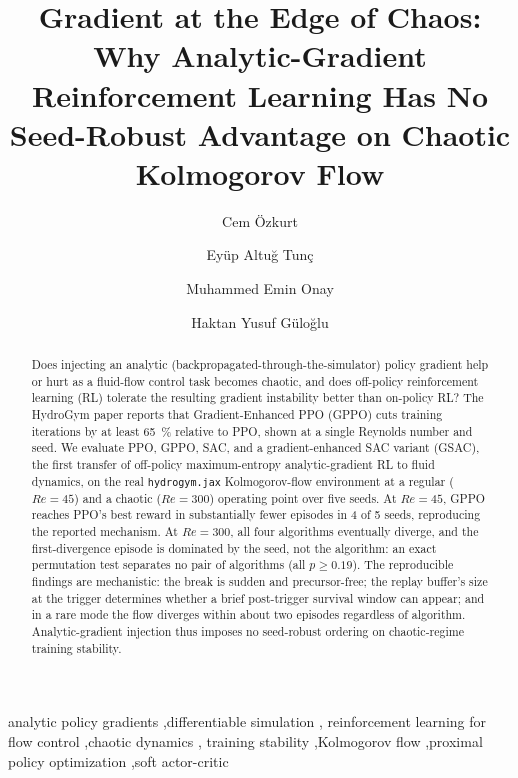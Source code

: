 \documentclass[preprint,12pt,3p]{elsarticle}
\renewcommand{\Re}{\mathit{Re}}
\begin{document}
\begin{frontmatter}

\title{Gradient at the Edge of Chaos: Why Analytic-Gradient
Reinforcement Learning Has No Seed-Robust Advantage on Chaotic
Kolmogorov Flow}

\author[su]{Cem \"Ozkurt}

\author[su]{Ey\"up Altu\u{g} Tun\c{c}}

\author[su]{Muhammed Emin Onay}

\author[su]{Haktan Yusuf G\"ulo\u{g}lu}


\begin{abstract}
Does injecting an analytic
(backpropagated-through-the-simulator) policy gradient help or hurt as a
fluid-flow control task becomes chaotic, and does off-policy reinforcement
learning (RL) tolerate the resulting gradient instability better than
on-policy RL? The HydroGym paper reports that Gradient-Enhanced PPO (GPPO)
cuts training iterations by at least \SI{65}{\percent} relative to PPO, shown
at a single Reynolds number and seed. We evaluate PPO, GPPO, SAC, and a
gradient-enhanced SAC variant (GSAC), the first transfer of off-policy
maximum-entropy analytic-gradient RL to fluid dynamics, on the real
\mbox{\texttt{hydrogym.jax}} Kolmogorov-flow environment at a regular
($\Re=45$) and a chaotic ($\Re=300$) operating point over five seeds. At
$\Re=45$, GPPO reaches PPO's best reward in substantially fewer episodes in 4
of 5 seeds, reproducing the reported mechanism. At $\Re=300$, all four
algorithms eventually diverge, and the first-divergence episode is dominated
by the seed, not the algorithm: an exact permutation test separates no pair
of algorithms (all $p\ge 0.19$). The reproducible findings are mechanistic:
the break is sudden and precursor-free; the replay buffer's size at the
trigger determines whether a brief post-trigger survival window can appear;
and in a rare mode the flow diverges within about two episodes regardless of
algorithm. Analytic-gradient injection thus imposes no seed-robust ordering
on chaotic-regime training stability.
\end{abstract}

\begin{keyword}
analytic policy gradients \sep differentiable simulation \sep
reinforcement learning for flow control \sep chaotic dynamics \sep
training stability \sep Kolmogorov flow \sep proximal policy optimization
\sep soft actor-critic
\end{keyword}

\end{frontmatter}
\end{document}
